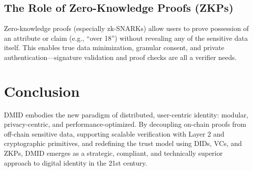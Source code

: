 \subsection{The Role of Zero-Knowledge Proofs (ZKPs)}
Zero-knowledge proofs (especially zk-SNARKs) allow users to prove possession of an attribute or claim (e.g., ``over 18'') without revealing any of the sensitive data itself.  
This enables true data minimization, granular consent, and private authentication—signature validation and proof checks are all a verifier needs.

\section*{Conclusion}
DMID embodies the new paradigm of distributed, user-centric identity: modular, privacy-centric, and performance-optimized. By decoupling on-chain proofs from off-chain sensitive data, supporting scalable verification with Layer 2 and cryptographic primitives, and redefining the trust model using DIDs, VCs, and ZKPs, DMID emerges as a strategic, compliant, and technically superior approach to digital identity in the 21st century.

